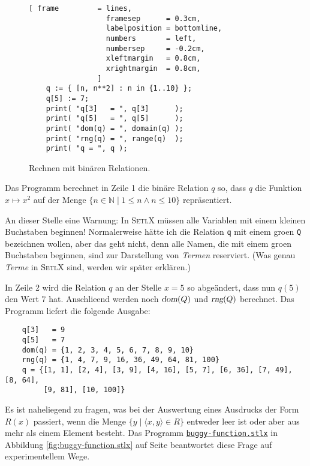 \begin{figure}[!ht]
  \centering
\begin{Verbatim}[ frame         = lines, 
                  framesep      = 0.3cm, 
                  labelposition = bottomline,
                  numbers       = left,
                  numbersep     = -0.2cm,
                  xleftmargin   = 0.8cm,
                  xrightmargin  = 0.8cm,
                ]
    q := { [n, n**2] : n in {1..10} };
    q[5] := 7;
    print( "q[3]   = ", q[3]      );
    print( "q[5]   = ", q[5]      );
    print( "dom(q) = ", domain(q) );
    print( "rng(q) = ", range(q)  );
    print( "q = ", q );
\end{Verbatim} 
\vspace*{-0.3cm}
\caption{Rechnen mit bin\"{a}ren Relationen.}  \label{fig:function.stlx}
\end{figure} %

\noindent
Das Programm berechnet in Zeile 1 die bin\"{a}re Relation $q$ so, dass $q$ die
Funktion $x \mapsto x^2$ auf der Menge $\{n\in \mathbb{N} \mid 1 \leq n \wedge n \leq 10 \}$
repr\"{a}sentiert.  

An dieser Stelle eine Warnung: In \textsc{SetlX} m\"{u}ssen alle Variablen mit einem kleinen
Buchstaben beginnen!  Normalerweise h\"{a}tte ich die Relation \texttt{q} mit einem gro\3en
\texttt{Q} bezeichnen wollen, aber das geht nicht, denn alle Namen, die mit einem gro\3en
Buchstaben beginnen, sind zur Darstellung von \emph{Termen} reserviert.  (Was genau \emph{Terme} in
\textsc{SetlX} sind, werden wir sp\"{a}ter erkl\"{a}ren.)

In Zeile 2 wird die Relation $q$ an der Stelle $x=5$ so abge\"{a}ndert, dass nun $q(5)$ den Wert
$7$ hat.   Anschlie\3end werden noch $\textsl{dom}(Q)$ und $\textsl{rng}(Q)$ berechnet.
Das Programm liefert die folgende Ausgabe:
\begin{verbatim}
    q[3]   = 9
    q[5]   = 7
    dom(q) = {1, 2, 3, 4, 5, 6, 7, 8, 9, 10}
    rng(q) = {1, 4, 7, 9, 16, 36, 49, 64, 81, 100}
    q = {[1, 1], [2, 4], [3, 9], [4, 16], [5, 7], [6, 36], [7, 49], [8, 64], 
         [9, 81], [10, 100]}
\end{verbatim}

Es ist naheliegend zu fragen, was bei der Auswertung eines Ausdrucks der Form
$R(x)$ passiert, wenn die Menge $\{ y \mid \langle x, y \rangle \in R \}$
entweder leer ist oder aber aus mehr als einem Element besteht. 
Das Programm 
\href{https://github.com/karlstroetmann/Logik/blob/master/SetlX/buggy-function.stlx}{\texttt{buggy-function.stlx}}
in Abbildung
\ref{fig:buggy-function.stlx} auf Seite \pageref{fig:buggy-function.stlx} beantwortet
diese Frage auf experimentellem Wege.

